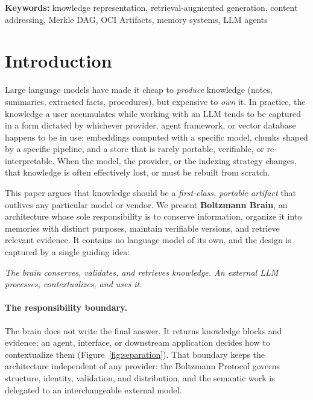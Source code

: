 \documentclass[11pt,a4paper]{article}
\providecommand{\keywords}[1]{%
  \vspace{0.5em}%
  \noindent\textbf{Keywords: }#1%
}
\begin{document}
\keywords{knowledge representation, retrieval-augmented generation, content
addressing, Merkle DAG, OCI Artifacts, memory systems, LLM agents}

\section{Introduction}
\label{sec:intro}

Large language models have made it cheap to \emph{produce} knowledge (notes,
summaries, extracted facts, procedures), but expensive to \emph{own} it. In
practice, the knowledge a user accumulates while working with an LLM tends to
be captured in a form dictated by whichever provider, agent framework, or
vector database happens to be in use: embeddings computed with a specific
model, chunks shaped by a specific pipeline, and a store that is rarely
portable, verifiable, or re-interpretable. When the model, the provider, or the indexing strategy changes, that knowledge
is often effectively lost, or must be rebuilt from scratch.

This paper argues that knowledge should be a \emph{first-class, portable
artifact} that outlives any particular model or vendor. We present
\textbf{Boltzmann Brain}, an architecture whose sole responsibility is to
conserve information, organize it into memories with distinct purposes,
maintain verifiable versions, and retrieve relevant evidence. It contains no
language model of its own, and the design is captured by a single guiding
idea:

\begin{callout}
\emph{The brain conserves, validates, and retrieves knowledge. An external LLM
processes, contextualizes, and uses it.}
\end{callout}

\paragraph{The responsibility boundary.}
The brain does not write the final answer. It returns knowledge blocks and
evidence; an agent, interface, or downstream application decides how to
contextualize them (Figure~\ref{fig:separation}). That boundary keeps the
architecture independent of any provider: the Boltzmann Protocol governs
structure, identity, validation, and distribution, and the semantic work is
delegated to an interchangeable external model.
\end{document}
